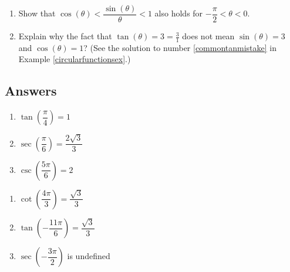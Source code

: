 \begin{enumerate}
\begin{enumerate}
\end{enumerate}

\item Show that $\cos(\theta) < \dfrac{\sin(\theta)}{\theta} < 1$ also holds for $-\dfrac{\pi}{2}< \theta < 0$.

\item  Explain why the fact that $\tan(\theta) = 3 = \frac{3}{1}$ does not mean $\sin(\theta) = 3$ and $\cos(\theta) = 1$?  (See the solution to number \ref{commontanmistake} in Example \ref{circularfunctionsex}.)

\end{enumerate}

\newpage

\subsection{Answers}

\begin{multicols}{3}

\begin{enumerate}

\item $\tan \left( \dfrac{\pi}{4} \right) = 1$ 
\item $\sec \left( \dfrac{\pi}{6} \right) = \dfrac{2\sqrt{3}}{3}$
\item $\csc \left( \dfrac{5\pi}{6} \right) = 2$ 

\setcounter{HW}{\value{enumi}}

\end{enumerate}

\end{multicols}

\begin{multicols}{3}

\begin{enumerate}

\setcounter{enumi}{\value{HW}}

\item $\cot \left( \dfrac{4\pi}{3} \right) = \dfrac{\sqrt{3}}{3}$
\item $\tan \left( -\dfrac{11\pi}{6} \right) = \dfrac{\sqrt{3}}{3}$
\item $\sec \left( -\dfrac{3\pi}{2} \right)$ is undefined 

\setcounter{HW}{\value{enumi}}

\end{enumerate}

\end{multicols}

